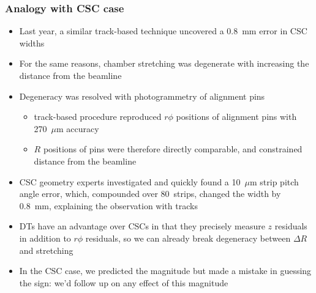 \documentclass[compress]{beamer}
\begin{document}
\begin{frame}
\frametitle{Analogy with CSC case}
\begin{itemize}
\item Last year, a similar track-based technique uncovered a 0.8~mm error in CSC widths
\item For the same reasons, chamber stretching was degenerate with increasing the distance from the beamline
\item Degeneracy was resolved with photogrammetry of alignment pins
\begin{itemize}
\item track-based procedure reproduced $r\phi$ positions of alignment pins with 270~$\mu$m accuracy
\item $R$ positions of pins were therefore directly comparable, and constrained distance from the beamline
\end{itemize}
\item CSC geometry experts investigated and quickly found a 10~$\mu$m strip pitch
  angle error, which, compounded over 80~strips, changed the width by
  0.8~mm, explaining the observation with tracks
\item DTs have an advantage over CSCs in that they precisely measure
  $z$ residuals in addition to $r\phi$ residuals, so we can already
  break degeneracy between $\Delta R$ and stretching
\item In the CSC case, we predicted the magnitude but made a mistake in guessing
  the sign: we'd follow up on any effect of this magnitude
\end{itemize}
\end{frame}
\end{document}
